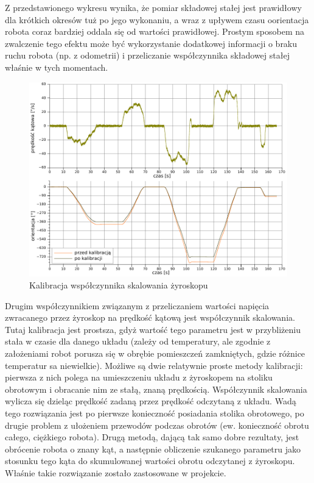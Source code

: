 Z przedstawionego wykresu wynika, że pomiar składowej stałej jest prawidłowy dla
krótkich okresów tuż po jego wykonaniu, a wraz z upływem czasu oorientacja
robota coraz bardziej oddala się od wartości prawidłowej. Prostym sposobem na
zwalczenie tego efektu może być wykorzystanie dodatkowej informacji o braku
ruchu robota (np. z odometrii) i przeliczanie współczynnika składowej stałej
właśnie w tych momentach.

\begin{figure}[ht!]
\centering
\includegraphics[width=\textwidth]{../../Common/pomiary/gyro_rot}
\caption{Kalibracja współczynnika skalowania żyroskopu}
\label{fig:gyro_rot}
\end{figure}

Drugim współczynnikiem związanym z przeliczaniem wartości napięcia zwracanego
przez żyroskop na prędkość kątową jest współczynnik skalowania. Tutaj kalibracja
jest prostsza, gdyż wartość tego parametru jest w przybliżeniu stała w czasie
dla danego układu (zależy od temperatury, ale zgodnie z założeniami robot
porusza się w obrębie pomieszczeń zamkniętych, gdzie różnice temperatur sa
niewielkie). Możliwe są dwie relatywnie proste metody kalibracji: pierwsza z
nich polega na umieszczeniu układu z żyroskopem na stoliku obrotowym i obracanie
nim ze stałą, znaną prędkością. Współczynnik skalowania wylicza się dzieląc
prędkość zadaną przez prędkość odczytaną z układu. Wadą tego rozwiązania jest po
pierwsze konieczność posiadania stolika obrotowego, po drugie problem z
ułożeniem przewodów podczas obrotów (ew. konieczność obrotu całego, ciężkiego
robota). Drugą metodą, dającą tak samo dobre rezultaty, jest obrócenie robota o
znany kąt, a następnie obliczenie szukanego parametru jako stosunku tego kąta do
skumulowanej wartości obrotu odczytanej z żyroskopu. Właśnie takie rozwiązanie
zostało zastosowane w projekcie.

